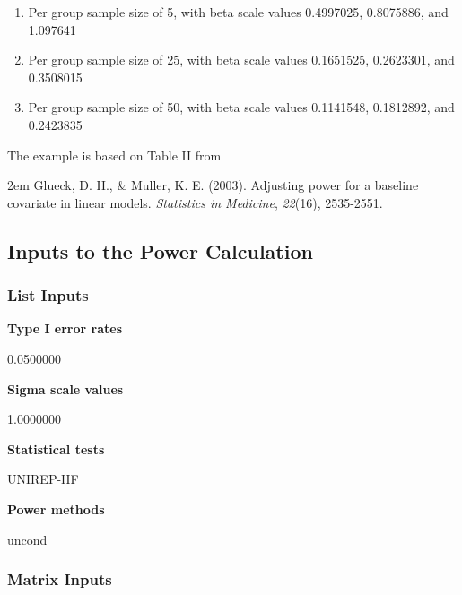 \documentclass{glimmpse-report}
\begin{document}
\begin{enumerate}\item Per group sample size of 5, with beta scale values 0.4997025, 0.8075886, and 1.097641\item Per group sample size of 25, with beta scale values 0.1651525, 0.2623301, and 0.3508015\item Per group sample size of 50, with beta scale values 0.1141548,  0.1812892, and  0.2423835
\end{enumerate}

The example is based on Table II from

\hangindent2em
 Glueck, D. H., \& Muller, K. E. (2003). Adjusting power for a baseline covariate in linear models. \emph{Statistics in Medicine}, \emph{22}(16), 2535-2551.


\subsection{Inputs to the Power Calculation}
\subsubsection{List Inputs}

{\bf Type I error rates}

0.0500000

{\bf Sigma scale values}

1.0000000

{\bf Statistical tests}

UNIREP-HF

{\bf Power methods}

uncond

\subsubsection{Matrix Inputs}
\end{document}
